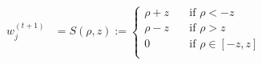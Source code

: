 \newcommand{\matrix}[1]{\mathbf{#1}}
\newcommand{\vector}[1]{\mathbf{#1}}
\newcommand{\X}{\matrix{X}}
\newcommand{\y}{\vector{y}}
\newcommand{\w}{\vector{w}}
\newcommand{\r}{\vector{r}}
\begin{align*}
w_j^{(t+1)} &= S(\rho, z) :=
\begin{cases}
    \rho + z & \quad \text{if } \rho < -z \\
    \rho - z & \quad \text{if } \rho > z \\
    0        & \quad \text{if } \rho \in [-z, z] \\
\end{cases} \\
\end{align*}
